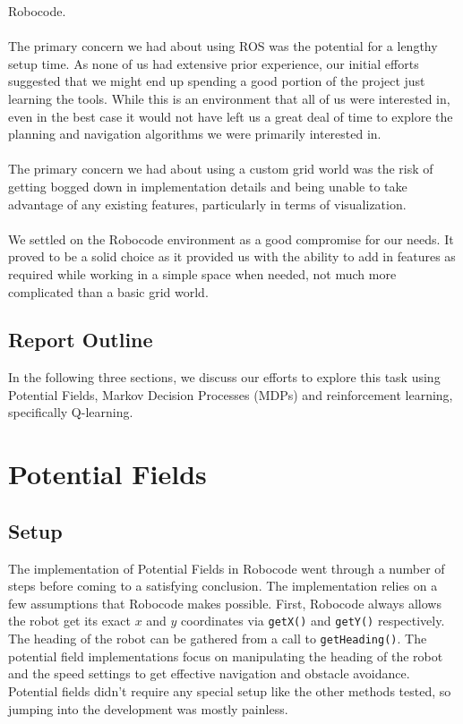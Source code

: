 \documentclass{aiaa-tc}%
\begin{document}
Robocode. \\ \\
The primary concern we had about using ROS was the potential for a lengthy setup time.
As none of us had extensive prior experience, our
initial efforts suggested that we might end up spending a good portion
of the project just learning the tools. While this is an environment that all
of us were interested in, even in the best case it would not have left
us a great deal of time to explore the planning and navigation
algorithms we were primarily interested in. \\ \\
The primary concern we had about using a custom grid world was the risk of getting bogged down
in implementation details and being unable to take advantage of any
existing features, particularly in terms of visualization. \\ \\
We settled on the Robocode environment as a good compromise for our
needs. It proved to be a solid choice as it provided us with the
ability to add in features as required while working in a simple
space when needed, not much more complicated than a basic grid world.


\subsection{Report Outline}
In the following three sections, we discuss our efforts to explore
this task using Potential Fields, Markov Decision Processes (MDPs) and
reinforcement learning, specifically Q-learning.

\section{Potential Fields}
\label{Potential Fields}

\subsection{Setup}
The implementation of Potential Fields in Robocode went through a number of steps before coming to a satisfying conclusion. The implementation relies on a few assumptions that Robocode makes possible. First, Robocode always allows the robot get its exact $x$ and $y$ coordinates via \verb|getX()| and \verb|getY()| respectively. The heading of the robot can be gathered from a call to \verb|getHeading()|. The potential field implementations focus on manipulating the heading of the robot and the speed settings to get effective navigation and obstacle avoidance. Potential fields didn't require any special setup like the other methods tested, so jumping into the development was mostly painless.
\end{document}
